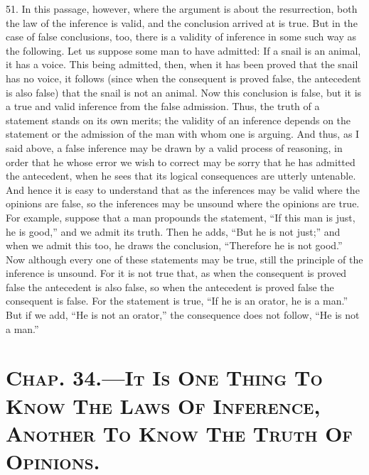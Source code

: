 51. In this passage, however, where the argument is about the
resurrection, both the law of the inference is valid, and the
conclusion arrived at is true. But in the case of false conclusions,
too, there is a validity of inference in some such way as the
following. Let us suppose some man to have admitted: If a snail is an
animal, it has a voice. This being admitted, then, when it has been
proved that the snail has no voice, it follows (since when the
consequent is proved false, the antecedent is also false) that the
snail is not an animal. Now this conclusion is false, but it is a true
and valid inference from the false admission. Thus, the truth of a
statement stands on its own merits; the validity of an inference
depends on the statement or the admission of the man with whom one is
arguing. And thus, as I said above, a false inference may be drawn by
a valid process of reasoning, in order that he whose error we wish to
correct may be sorry that he has admitted the antecedent, when he sees
that its logical consequences are utterly untenable. And hence it is
easy to understand that as the inferences may be valid where the
opinions are false, so the inferences may be unsound where the
opinions are true. For example, suppose that a man propounds the
statement, ``If this man is just, he is good,'' and we admit its
truth. Then he adds, ``But he is not just;'' and when we admit this
too, he draws the conclusion, ``Therefore he is not good.'' Now
although every one of these  statements may be true, still
the principle of the inference is unsound. For it is not true that, as
when the consequent is proved false the antecedent is also false, so
when the antecedent is proved false the consequent is false. For the
statement is true, ``If he is an orator, he is a man.'' But if we add,
``He is not an orator,'' the consequence does not follow, ``He is not
a man.''

\section*{\textsc{Chap}. 34.\smaller---\textsc{It Is One Thing To Know
The Laws Of Inference, Another To Know The Truth Of Opinions}.}

